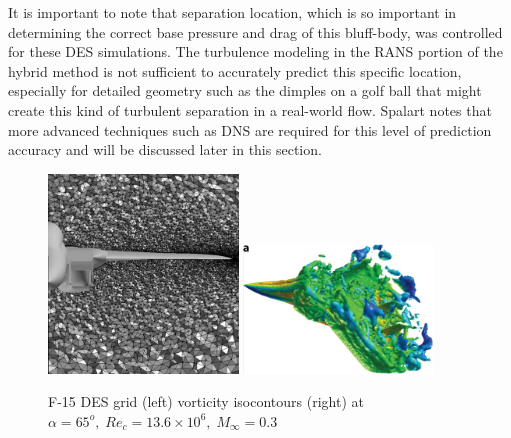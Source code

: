 \documentclass[journal]{new-aiaa}
\begin{document}
It is important to note that separation location, which is so important in determining the correct base pressure and drag of this bluff-body, was controlled for these DES simulations. The turbulence modeling in the RANS portion of the hybrid method is not sufficient to accurately predict this specific location, especially for detailed geometry such as the dimples on a golf ball that might create this kind of turbulent separation in a real-world flow. Spalart notes that more advanced techniques such as DNS are required for this level of prediction accuracy and will be discussed later in this section.








\begin{figure}[H]
\begin{center}
\includegraphics[width=0.45\textwidth]{Images/logan/forsythe2004detachededdy_f15grid.pdf}
\includegraphics[width=0.45\textwidth]{Images/logan/spalart2009detachededdy_f15des.pdf}
\caption{ F-15 DES grid (left) \cite{forsythe2004detachededdy} vorticity isocontours (right) at $\alpha=65^o, \; Re_c=13.6\times10^6, \; M_{\infty}=0.3$ \cite{spalart2009detachededdy} }
\label{fig:f15des}
\end{center}
\end{figure}
\end{document}
